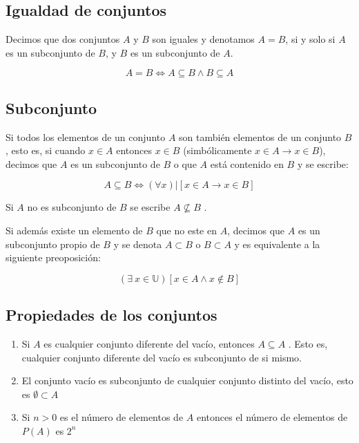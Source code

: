 \subsection{Igualdad de conjuntos}

Decimos que dos conjuntos $A$ y $B$ son iguales y denotamos $A=B$, si y solo si
$A$ es un subconjunto de $B$, y $B$ es un subconjunto de $A$.

\begin{equation}
    A=B \iff A \subseteq B \land B \subseteq A
\end{equation}

\subsection{Subconjunto}

Si todos los elementos de un conjunto $A$ son también elementos de un conjunto
$B$, esto es, si cuando $x \in A$ entonces $x \in B$ (simbólicamente $x \in A
\rightarrow x \in B$), decimos que $A$ es un subconjunto de $B$ o que $A$ está
contenido en $B$ y se escribe:

\begin{equation}
    A \subseteq B \iff (\forall x)|[x \in A \rightarrow x \in B]
\end{equation}

Si $A$ no es subconjunto de $B$ se escribe $A \not \subseteq B$ .

Si además existe un elemento de $B$ que no este en $A$, decimos que $A$ es un
subconjunto propio de $B$ y se denota $A \subset B$ o $B \subset A$ y es
equivalente a la siguiente preoposición:

\begin{equation}
    (\exists \ x \in \mathbb U)[x \in A \land x \not\in B]
\end{equation}

\subsection{Propiedades de los conjuntos}

\begin{enumerate}
    \item Si $A$ es cualquier conjunto diferente del vacío, entonces $A \subseteq A$ .
    Esto es, cualquier conjunto diferente del vacío es subconjunto de si mismo.

    \item El conjunto vacío es subconjunto de cualquier conjunto distinto del vacío,
    esto es $\emptyset \subset A$

    \item Si $n>0$ es el número de elementos de $A$ entonces el número de elementos
de $P(A)$ es $2^n$
\end{enumerate}

